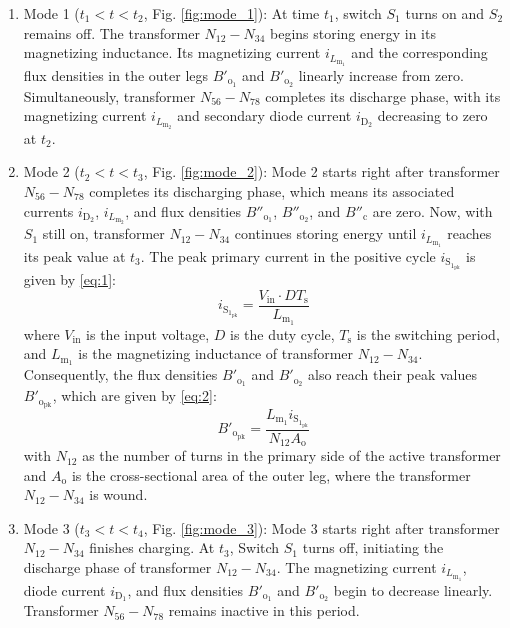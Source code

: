 \documentclass[lettersize,journal]{IEEEtran}
\begin{document}
\begin{enumerate}
    \item Mode 1 ($t_1 < t < t_2$, Fig. \ref{fig:mode_1}): At time $t_1$, switch $S_1$ turns on and $S_2$ remains off. The transformer $N_{12}-N_{34}$ begins storing energy in its magnetizing inductance. Its magnetizing current $i_{L_{\mathrm{m}_1}}$ and the corresponding flux densities in the outer legs $B'_{\mathrm{o}_1}$ and $B'_{\mathrm{o}_2}$ linearly increase from zero. Simultaneously, transformer $N_{56}-N_{78}$ completes its discharge phase, with its magnetizing current $i_{L_{\mathrm{m}_2}}$ and secondary diode current $i_{\mathrm{D}_2}$ decreasing to zero at $t_2$.

    \item Mode 2 ($t_2 < t < t_3$, Fig. \ref{fig:mode_2}): Mode 2 starts right after transformer $N_{56}-N_{78}$ completes its discharging phase, which means its associated currents $i_{\mathrm{D}_2}$, $i_{L_{\mathrm{m}_2}}$, and flux densities $B''_{\mathrm{o}_1}$, $B''_{\mathrm{o}_2}$, and $B''_{\mathrm{c}}$ are zero. Now, with $S_1$ still on, transformer $N_{12}-N_{34}$ continues storing energy until $i_{L_{\mathrm{m}_1}}$ reaches its peak value at $t_3$. The peak primary current in the positive cycle $i_{\mathrm{S}_{1_{\mathrm{pk}}}}$ is given by \eqref{eq:1}:
    \begin{equation}
    \label{eq:1}
    i_{\mathrm{S}_{1_{\mathrm{pk}}}} = \frac{V_{\mathrm{in}} \cdot DT_{\mathrm{s}}}{L_{\mathrm{m}_1}}
    \end{equation}
    where $V_{\mathrm{in}}$ is the input voltage, $D$ is the duty cycle, $T_{\mathrm{s}}$ is the switching period, and $L_{\mathrm{m}_1}$ is the magnetizing inductance of transformer $N_{12}-N_{34}$. Consequently, the flux densities $B'_{\mathrm{o}_1}$ and $B'_{\mathrm{o}_2}$ also reach their peak values $B'_{\mathrm{o}_{\mathrm{pk}}}$, which are given by \eqref{eq:2}:
    \begin{equation}
    \label{eq:2}
    B'_{\mathrm{o}_{\mathrm{pk}}} = \frac{L_{\mathrm{m}_1} i_{\mathrm{S}_{1_{\mathrm{pk}}}}}{N_{12} A_{\mathrm{o}}}
    \end{equation}
    with $N_{12}$ as the number of turns in the primary side of the active transformer and $A_{\mathrm{o}}$ is the cross-sectional area of the outer leg, where the transformer $N_{12}-N_{34}$ is wound.

    \item Mode 3 ($t_3 < t < t_4$, Fig. \ref{fig:mode_3}): Mode 3 starts right after transformer $N_{12}-N_{34}$ finishes charging. At $t_3$, Switch $S_1$ turns off, initiating the discharge phase of transformer $N_{12}-N_{34}$. The magnetizing current $i_{L_{\mathrm{m}_1}}$, diode current $i_{\mathrm{D}_1}$, and flux densities $B'_{\mathrm{o}_1}$ and $B'_{\mathrm{o}_2}$ begin to decrease linearly. Transformer $N_{56}-N_{78}$ remains inactive in this period.
\end{enumerate}
\end{document}

